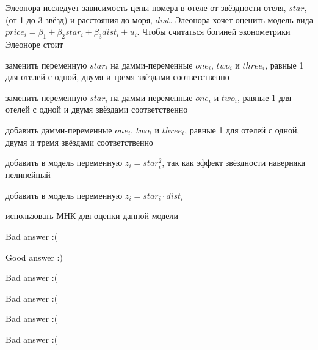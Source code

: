 
\begin{question}
Элеонора исследует зависимость цены номера в отеле от звёздности отеля, \(star\),
(от 1 до 3 звёзд) и расстояния до моря, \(dist\).
Элеонора хочет оценить модель вида
\(price_i = \beta_1 + \beta_2 star_i + \beta_3 dist_i + u_i\).
Чтобы считаться богиней эконометрики Элеоноре стоит
\begin{answerlist}
  \item заменить переменную \(star_i\) на дамми-переменные \(one_i\), \(two_i\) и \(three_i\), равные 1 для отелей с одной, двумя и тремя звёздами соответственно
  \item заменить переменную \(star_i\) на дамми-переменные \(one_i\) и \(two_i\), равные 1 для отелей с одной и двумя звёздами соответственно
  \item добавить дамми-переменные \(one_i\), \(two_i\) и \(three_i\), равные 1 для отелей с одной, двумя и тремя звёздами соответственно
  \item добавить в модель переменную \(z_i = star^2_i\), так как эффект звёздности наверняка нелинейный
  \item добавить в модель переменную \(z_i = star_i \cdot dist_i\)
  \item использовать МНК для оценки данной модели
\end{answerlist}
\end{question}

\begin{solution}
\begin{answerlist}
  \item Bad answer :(
  \item Good answer :)
  \item Bad answer :(
  \item Bad answer :(
  \item Bad answer :(
  \item Bad answer :(
\end{answerlist}
\end{solution}

